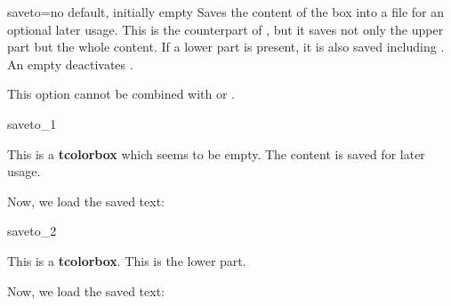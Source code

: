 \clearpage
\begin{docTcbKey}[][doc new=2015-05-04]{saveto}{=}{no default, initially empty}
  Saves the content of the box into a file for an optional later usage.
  This is the counterpart of , but it saves not
  only the upper part but the whole content. If a lower part is present,
  it is also saved including .
  An empty  deactivates .
  \begin{marker}
  This option cannot be combined with  or
  .
  \end{marker}

\begin{exdispExample}{saveto_1}
\begin{tcolorbox}[invisible,saveto=\jobname_mysave1.tex,colback=white]
This is a \textbf{tcolorbox} which seems to be empty.
The content is saved for later usage.
\end{tcolorbox}

Now, we load the saved text:\\

\end{exdispExample}

\begin{exdispExample}{saveto_2}
\begin{tcolorbox}[saveto=\jobname_mysave2.tex]
This is a \textbf{tcolorbox}.
\tcblower
This is the lower part.
\end{tcolorbox}

Now, we load the saved text:
\begin{tcolorbox}[colframe=red,colback=red!10,
  coltitle=black,colbacktitle=red!20,sidebyside,
  title=Here we see the saved content including the lower part]

\end{tcolorbox}
\end{exdispExample}
\end{docTcbKey}



\clearpage
